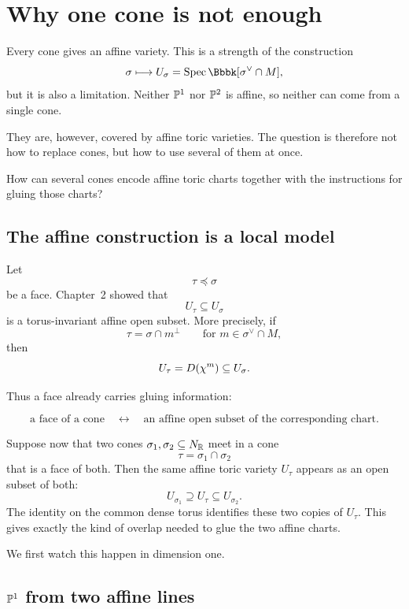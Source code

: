 \section{Why one cone is not enough}
\label{sec:why-one-cone-not-enough}

Every cone gives an affine variety. This is a strength of the
construction
\[
\sigma\longmapsto
U_\sigma
=
\Spec\Bbbk[\sigma^\vee\cap M],
\]
but it is also a limitation. Neither \(\mathbb{P}^1\) nor \(\mathbb{P}^2\) is
affine, so neither can come from a single cone.

They are, however, covered by affine toric varieties. The question is
therefore not how to replace cones, but how to use several of them at
once.

\begin{guidingquestion}
How can several cones encode affine toric charts together with the
instructions for gluing those charts?
\end{guidingquestion}

\subsection{The affine construction is a local model}

Let
\[
\tau\preceq\sigma
\]
be a face. Chapter~2 showed that
\[
U_\tau\subseteq U_\sigma
\]
is a torus-invariant affine open subset. More precisely, if
\[
\tau=\sigma\cap m^\perp
\qquad
\text{for }m\in\sigma^\vee\cap M,
\]
then
\[
U_\tau
=
D(\chi^{m})
\subseteq U_\sigma.
\]

Thus a face already carries gluing information:

\[
\boxed{
\text{a face of a cone}
\quad\longleftrightarrow\quad
\text{an affine open subset of the corresponding chart}.
}
\]

Suppose now that two cones \(\sigma_1,\sigma_2\subseteq N_{\mathbb{R}}\)
meet in a cone
\[
\tau=\sigma_1\cap\sigma_2
\]
that is a face of both. Then the same affine toric variety \(U_\tau\)
appears as an open subset of both:
\[
U_{\sigma_1}
\supseteq
U_\tau
\subseteq
U_{\sigma_2}.
\]
The identity on the common dense torus identifies these two copies of
\(U_\tau\). This gives exactly the kind of overlap needed to glue the
two affine charts.

We first watch this happen in dimension one.

\subsection{\texorpdfstring{\(\mathbb{P}^1\)}{P1} from two affine lines}

